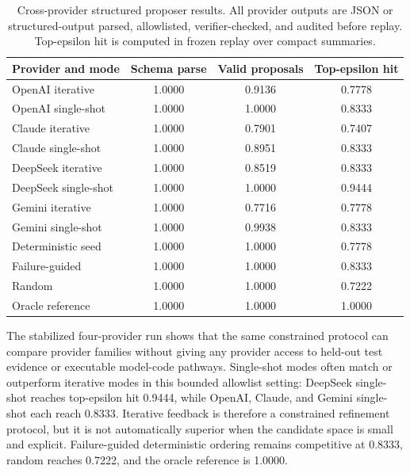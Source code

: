 \begin{table}[H]
\centering
\small
\caption{Cross-provider structured proposer results. All provider outputs are
JSON or structured-output parsed, allowlisted, verifier-checked, and audited
before replay. Top-epsilon hit is computed in frozen replay over compact
summaries.}
\label{tab:provider-stage9}
\begin{tabular}{lccc}
\toprule
Provider and mode & Schema parse & Valid proposals & Top-epsilon hit \\
\midrule
OpenAI iterative & \num{1.0000} & \num{0.9136} & \num{0.7778} \\
OpenAI single-shot & \num{1.0000} & \num{1.0000} & \num{0.8333} \\
Claude iterative & \num{1.0000} & \num{0.7901} & \num{0.7407} \\
Claude single-shot & \num{1.0000} & \num{0.8951} & \num{0.8333} \\
DeepSeek iterative & \num{1.0000} & \num{0.8519} & \num{0.8333} \\
DeepSeek single-shot & \num{1.0000} & \num{1.0000} & \num{0.9444} \\
Gemini iterative & \num{1.0000} & \num{0.7716} & \num{0.7778} \\
Gemini single-shot & \num{1.0000} & \num{0.9938} & \num{0.8333} \\
\midrule
Deterministic seed & \num{1.0000} & \num{1.0000} & \num{0.7778} \\
Failure-guided & \num{1.0000} & \num{1.0000} & \num{0.8333} \\
Random & \num{1.0000} & \num{1.0000} & \num{0.7222} \\
Oracle reference & \num{1.0000} & \num{1.0000} & \num{1.0000} \\
\bottomrule
\end{tabular}
\end{table}

The stabilized four-provider run shows that the same constrained protocol can
compare provider families without giving any provider access to held-out test
evidence or executable model-code pathways. Single-shot modes often match or
outperform iterative modes in this bounded allowlist setting: DeepSeek
single-shot reaches top-epsilon hit \num{0.9444}, while OpenAI, Claude, and
Gemini single-shot each reach \num{0.8333}. Iterative feedback is therefore a
constrained refinement protocol, but it is not automatically superior when the
candidate space is small and explicit. Failure-guided deterministic ordering
remains competitive at \num{0.8333}, random reaches \num{0.7222}, and the
oracle reference is \num{1.0000}.

